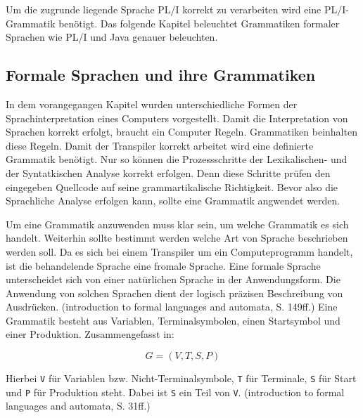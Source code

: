 Um die zugrunde liegende Sprache PL/I korrekt zu verarbeiten wird eine PL/I-Grammatik benötigt. Das folgende Kapitel beleuchtet Grammatiken formaler Sprachen wie PL/I und Java genauer beleuchten.


\pagebreak
   
   
\subsection{Formale Sprachen und ihre Grammatiken}
In dem vorangegangen Kapitel wurden unterschiedliche Formen der Sprachinterpretation eines Computers vorgestellt. Damit die Interpretation von Sprachen korrekt erfolgt, braucht ein Computer Regeln. Grammatiken beinhalten diese Regeln. Damit der Transpiler korrekt arbeitet wird eine definierte Grammatik benötigt. Nur so können die Prozessschritte der Lexikalischen- und der Syntatkischen Analyse korrekt erfolgen. Denn diese Schritte prüfen den eingegeben Quellcode auf seine grammartikalische Richtigkeit. Bevor also die Sprachliche Analyse erfolgen kann, sollte eine Grammatik angwendet werden.
	
Um eine Grammatik anzuwenden muss klar sein, um welche Grammatik es sich handelt. Weiterhin sollte bestimmt werden welche Art von Sprache beschrieben werden soll. 
Da es sich bei einem Transpiler um ein Computeprogramm handelt, ist die behandelende Sprache eine fromale Sprache. Eine formale Sprache unterscheidet sich von einer natürlichen Sprache in der Anwendungsform. Die Anwendung von solchen Sprachen dient der logisch präzisen Beschreibung von Ausdrücken. (introduction to formal languages and automata, S. 149ff.) Eine Grammatik besteht aus Variablen, Terminalsymbolen, einen Startsymbol und einer Produktion. Zusammengefasst in:

\begin{center}
\begin{equation}
G=(V,T,S,P)
\end{equation}
\end{center}

Hierbei \verb+V+ für Variablen bzw. Nicht-Terminalsymbole, \verb+T+ für Terminale, \verb+S+ für Start und \verb+P+ für Produktion steht. Dabei ist \verb+S+ ein Teil von \verb+V+. (introduction to formal languages and automata, S. 31ff.)


